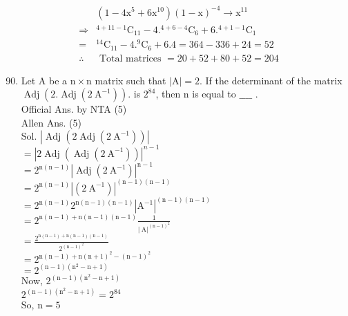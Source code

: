 \documentclass[10pt]{article}
\begin{document}
\[
\begin{aligned}
& \left(1-4 \mathrm{x}^{5}+6 \mathrm{x}^{10}\right)(1-\mathrm{x})^{-4} \rightarrow \mathrm{x}^{11} \\
\Rightarrow & { }^{4+11-1} \mathrm{C}_{11}-4 .{ }^{4+6-4} \mathrm{C}_{6}+6 .{ }^{4+1-1} \mathrm{C}_{1} \\
= & { }^{14} \mathrm{C}_{11}-4 .{ }^{9} \mathrm{C}_{6}+6.4=364-336+24=52 \\
\therefore & \text { Total matrices }=20+52+80+52=204
\end{aligned}
\]

\begin{enumerate}
  \setcounter{enumi}{89}
  \item Let A be a \(\mathrm{n} \times \mathrm{n}\) matrix such that \(|\mathrm{A}|=2\). If the determinant of the matrix \(\operatorname{Adj}\left(2 . \operatorname{Adj}\left(2 \mathrm{~A}^{-1}\right)\right)\). is \(2^{84}\), then n is equal to \(\_\_\_\_\) .\\
Official Ans. by NTA (5)\\
Allen Ans. (5)\\
Sol. \(\left|\operatorname{Adj}\left(2 \operatorname{Adj}\left(2 \mathrm{~A}^{-1}\right)\right)\right|\)\\
\(=\left|2 \operatorname{Adj}\left(\operatorname{Adj}\left(2 \mathrm{~A}^{-1}\right)\right)\right|^{n-1}\)\\
\(=2^{\mathrm{n}(\mathrm{n}-1)}\left|\operatorname{Adj}\left(2 \mathrm{~A}^{-1}\right)\right|^{\mathrm{n}-1}\)\\
\(=2^{\mathrm{n}(\mathrm{n}-1)}\left|\left(2 \mathrm{~A}^{-1}\right)\right|^{(\mathrm{n}-1)(\mathrm{n}-1)}\)\\
\(=2^{\mathrm{n}(\mathrm{n}-1)} 2^{\mathrm{n}(\mathrm{n}-1)(\mathrm{n}-1)}\left|\mathrm{A}^{-1}\right|^{(\mathrm{n}-1)(\mathrm{n}-1)}\)\\
\(=2^{\mathrm{n}(\mathrm{n}-1)+\mathrm{n}(\mathrm{n}-1)(\mathrm{n}-1)} \frac{1}{|\mathrm{~A}|^{(\mathrm{n}-1)^{2}}}\)\\
\(=\frac{2^{\mathrm{n}(\mathrm{n}-1)+\mathrm{n}(\mathrm{n}-1)(\mathrm{n}-1)}}{2^{(\mathrm{n}-1)^{2}}}\)\\
\(=2^{\mathrm{n}(\mathrm{n}-1)+\mathrm{n}(\mathrm{n}+1)^{2}-(\mathrm{n}-1)^{2}}\)\\
\(=2^{(\mathrm{n}-1)\left(\mathrm{n}^{2}-\mathrm{n}+1\right)}\)\\
Now, \(2^{(\mathrm{n}-1)\left(\mathrm{n}^{2}-\mathrm{n}+1\right)}\)\\
\(2^{(\mathrm{n}-1)\left(\mathrm{n}^{2}-\mathrm{n}+1\right)}=2^{84}\)\\
So, \(\mathrm{n}=5\)
\end{enumerate}
\end{document}
